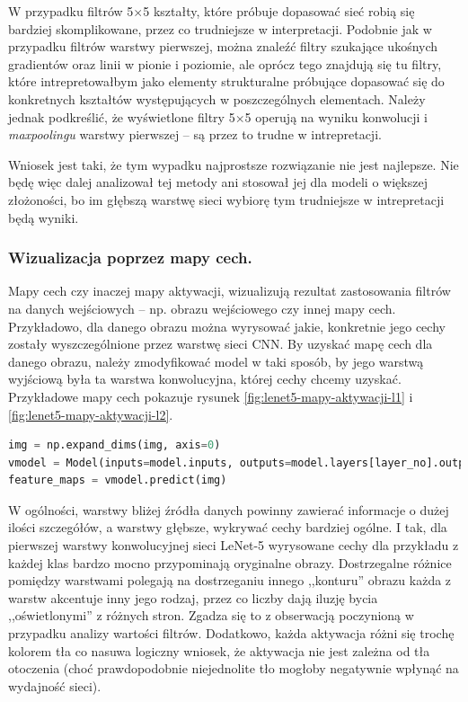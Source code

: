W przypadku filtrów 5\(\times\)5 kształty, które próbuje dopasować sieć robią się bardziej skomplikowane, przez co trudniejsze w interpretacji. Podobnie jak w przypadku filtrów warstwy pierwszej, można znaleźć filtry szukające ukośnych gradientów oraz linii w pionie i poziomie, ale oprócz tego znajdują się tu filtry, które intrepretowałbym jako elementy strukturalne próbujące dopasować się do konkretnych kształtów występujących w poszczególnych elementach. Należy jednak podkreślić, że
wyświetlone filtry 5\(\times\)5 operują na wyniku konwolucji i \textit{maxpoolingu} warstwy pierwszej -- są przez to trudne w intrepretacji.

Wniosek jest taki, że tym wypadku najprostsze rozwiązanie nie jest najlepsze. Nie będę więc dalej analizował tej metody ani stosował jej dla modeli o większej złożoności, bo im głębszą warstwę sieci wybiorę tym trudniejsze w intrepretacji będą wyniki.

\subsubsection{Wizualizacja poprzez mapy cech.}
Mapy cech czy inaczej mapy aktywacji, wizualizują rezultat zastosowania filtrów na danych wejściowych -- np. obrazu wejściowego czy innej mapy cech. Przykładowo, dla danego obrazu można wyrysować jakie, konkretnie jego cechy zostały wyszczególnione przez warstwę sieci CNN. 
By uzyskać mapę cech dla danego obrazu, należy zmodyfikować model w taki sposób, by jego warstwą wyjściową była ta warstwa konwolucyjna, której cechy chcemy uzyskać. Przykładowe mapy cech pokazuje rysunek \ref{fig:lenet5-mapy-aktywacji-l1} i \ref{fig:lenet5-mapy-aktywacji-l2}.

\begin{lstlisting}[language=Python, caption={Uzyskiwanie mapy aktywacji dla danego modelu i obrazu w Keras.}, label={lst:lenet5keras-mapy}, captionpos=b]
img = np.expand_dims(img, axis=0)
vmodel = Model(inputs=model.inputs, outputs=model.layers[layer_no].output)
feature_maps = vmodel.predict(img)
\end{lstlisting}

W ogólności, warstwy bliżej źródła danych powinny zawierać informacje o dużej ilości szczegółów, a warstwy głębsze, wykrywać cechy bardziej ogólne. I tak, 
dla pierwszej warstwy konwolucyjnej sieci LeNet-5 wyrysowane cechy dla przykładu z każdej klas bardzo mocno przypominają oryginalne obrazy. Dostrzegalne różnice pomiędzy warstwami polegają na dostrzeganiu innego ,,konturu'' obrazu każda z warstw akcentuje inny jego rodzaj, przez co liczby dają iluzję bycia ,,oświetlonymi'' z różnych stron.
Zgadza się to z obserwacją poczynioną w przypadku analizy wartości filtrów. Dodatkowo, każda aktywacja różni się trochę kolorem tła co nasuwa logiczny wniosek, że aktywacja nie jest zależna od tła otoczenia (choć prawdopodobnie niejednolite tło mogłoby negatywnie wpłynąć na wydajność sieci).

